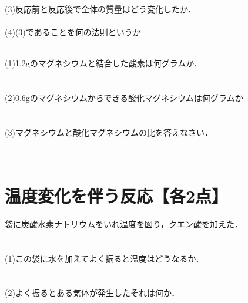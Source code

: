 \documentclass[autodetect-engine,dvi=dvipdfmx,ja=standard,
               a4j,11pt]{bxjsarticle}
\begin{document}
    (3)反応前と反応後で全体の質量はどう変化したか．\\\\

    (4)(3)であることを何の法則というか\\\\
\clearpage

  \begin{figure}[htb]
        \centering
        \vspace{20pt} %
        \caption{}
\end{figure}  
 (1)1.2gのマグネシウムと結合した酸素は何グラムか．\\\\\\

 (2)0.6gのマグネシウムからできる酸化マグネシウムは何グラムか\\\\\\

 (3)マグネシウムと酸化マグネシウムの比を答えなさい．   \\\\\\

 \section{温度変化を伴う反応【各2点】}
 袋に炭酸水素ナトリウムをいれ温度を図り，クエン酸を加えた．\\\\\\
 
 (1)この袋に水を加えてよく振ると温度はどうなるか．\\\\\\

 (2)よく振るとある気体が発生したそれは何か．\\\\\\
\end{document}
